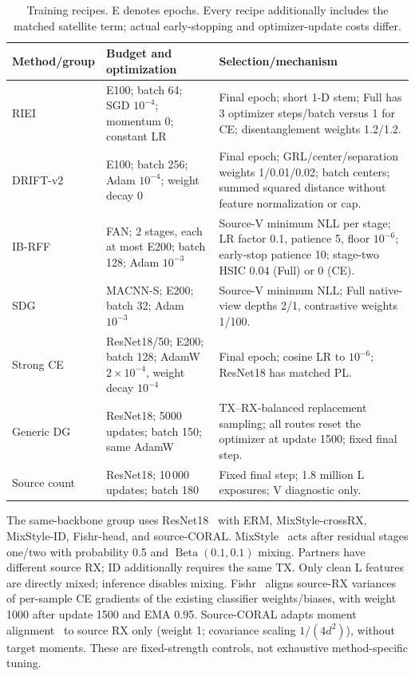 \begin{table}[t]
\centering\footnotesize
\caption{Training recipes. E denotes epochs. Every recipe additionally includes the matched satellite term; actual early-stopping and optimizer-update costs differ.}
\label{tab:budgets}
\begin{tabular}{l>{\raggedright\arraybackslash}p{}>{\raggedright\arraybackslash}p{}}
\toprule
Method/group & Budget and optimization & Selection/mechanism \\
\midrule
RIEI & E100; batch 64; SGD $10^{-4}$; momentum 0; constant LR & Final epoch; short 1-D stem; Full has 3 optimizer steps/batch versus 1 for CE; disentanglement weights 1.2/1.2. \\
DRIFT-v2 & E100; batch 256; Adam $10^{-4}$; weight decay 0 & Final epoch; GRL/center/separation weights 1/0.01/0.02; batch centers; summed squared distance without feature normalization or cap. \\
IB-RFF & FAN; 2 stages, each at most E200; batch 128; Adam $10^{-3}$ & Source-V minimum NLL per stage; LR factor 0.1, patience 5, floor $10^{-6}$; early-stop patience 10; stage-two HSIC 0.04 (Full) or 0 (CE). \\
SDG & MACNN-S; E200; batch 32; Adam $10^{-3}$ & Source-V minimum NLL; Full native-view depths 2/1, contrastive weights 1/100. \\
Strong CE & ResNet18/50; E200; batch 128; AdamW $2\!\times\!10^{-4}$, weight decay $10^{-4}$ & Final epoch; cosine LR to $10^{-6}$; ResNet18 has matched PL. \\
Generic DG & ResNet18; 5000 updates; batch 150; same AdamW & TX--RX-balanced replacement sampling; all routes reset the optimizer at update 1500; fixed final step. \\
Source count & ResNet18; 10\,000 updates; batch 180 & Fixed final step; 1.8 million L exposures; V diagnostic only. \\
\bottomrule
\end{tabular}
\end{table}

The same-backbone group uses ResNet18~\cite{resnet} with ERM, MixStyle-crossRX, MixStyle-ID, Fishr-head, and source-CORAL. MixStyle~\cite{mixstyle} acts after residual stages one/two with probability 0.5 and $\operatorname{Beta}(0.1,0.1)$ mixing. Partners have different source RX; ID additionally requires the same TX. Only clean L features are directly mixed; inference disables mixing. Fishr~\cite{fishr} aligns source-RX variances of per-sample CE gradients of the existing classifier weights/biases, with weight 1000 after update 1500 and EMA 0.95. Source-CORAL adapts moment alignment~\cite{coral} to source RX only (weight 1; covariance scaling $1/(4d^2)$), without target moments. These are fixed-strength controls, not exhaustive method-specific tuning.

